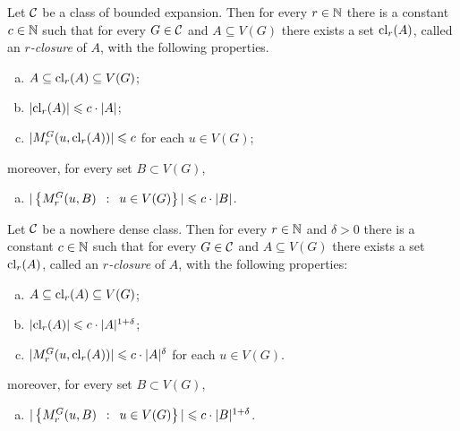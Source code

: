 \begin{lemma}\label{lem:closure-be}
Let $\mathcal{C}$ be a class of bounded expansion. 
Then for every $r\in \mathbb{N}$ there is a constant $c\in \mathbb{N}$ such that for
every $G\in \mathcal{C}$ and $A\subseteq V(G)$ there exists a set $\mathrm{cl}_r(A)$, called an {\em{$r$-closure}} of $A$, with the following properties. 
\begin{enumerate}[(a)]
  \item $A\subseteq \mathrm{cl}_r(A)\subseteq V(G)$;
  \item $|\mathrm{cl}_r(A)|\leqslant c\cdot |A|$; 
  \item $|M_r^G(u,\mathrm{cl}_r(A))|\leqslant c$ for each $u\in V(G)$;
  \end{enumerate}
  moreover, for every set $B\subset V(G)$, 
  \begin{enumerate}[(d)]
  \item $|\left\{M_r^G(u,B) \,~:~\, u\in V(G) \right\}|\leqslant c\cdot |B|$.
\end{enumerate}
\end{lemma}

\begin{lemma}\label{lem:closure-nd}
Let $\mathcal{C}$ be a nowhere dense class. 
Then for every $r\in\mathbb{N}$ and $\delta>0$ there is a 
constant $c\in\mathbb{N}$ such that for every $G\in \mathcal{C}$ and $A\subseteq V(G)$ there exists a set 
$\mathrm{cl}_r(A)$,  called an {\em{$r$-closure}} of $A$, 
with the following properties: 
\begin{enumerate}[(a)]
  \item $A\subseteq \mathrm{cl}_r(A)\subseteq V(G)$;
  \item $|\mathrm{cl}_r(A)|\leqslant c\cdot |A|^{1+\delta}$; 
  \item $|M_r^G(u,\mathrm{cl}_r(A))|\leqslant c\cdot |A|^{\delta}$ for each $u\in V(G)$.
  \end{enumerate}
  moreover, for every set $B\subset V(G)$, 
  \begin{enumerate}[(d)]  
  \item $|\left\{M_r^G(u,B) \,~:~\, u\in V(G) \right\}|\leqslant c\cdot |B|^{1+\delta}$.
\end{enumerate}
\end{lemma}

